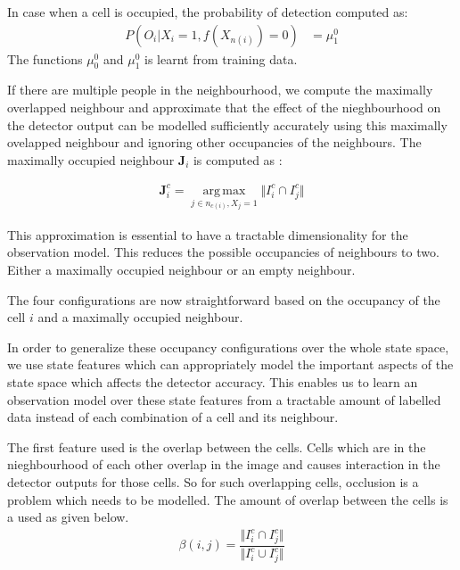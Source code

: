 \documentclass[10pt,twocolumn,letterpaper]{article}
\begin{document}
In case when a cell is occupied, the probability of detection computed as:
\begin{align}
 P(O_{i} |X_{i}=1 ,f(X_{n(i)}) =0)  &=\mu^{0}_{1}
\end{align}
The functions $ \mu^{0}_{0} $  and $ \mu^{0}_{1} $ is learnt from training data.


If there are multiple people in the neighbourhood, we compute the maximally overlapped neighbour and approximate that the effect of the nieghbourhood on the detector output can be modelled sufficiently accurately using this maximally ovelapped neighbour and ignoring other occupancies of the neighbours. The maximally occupied neighbour $ \textbf{J}_{i} $ is computed as :

\begin{align}
 \textbf{J}_{i}^{c} = \operatorname*{arg\,max}_{j\in n_{c(i)},X_{j}=1} \Vert I_{i}^{c}\cap I_{j}^{c} \Vert  
\end{align}

This approximation is essential to have a tractable dimensionality for the observation model. 
This reduces the possible occupancies of neighbours to two. Either a maximally occupied neighbour or an empty neighbour. 

The four configurations are now straightforward based on the occupancy of the cell $i$ and a maximally occupied neighbour.

In order to generalize these occupancy configurations over the whole state space, we use state features which can appropriately  
model the important aspects of the state space which affects the detector accuracy. This enables us to learn an observation model over these state features from a tractable amount of labelled data instead of each combination of a cell and its neighbour.

The first feature used is the overlap between the cells. Cells which are in the nieghbourhood of each other overlap in the image and causes interaction in the detector outputs for those cells. So for such overlapping cells, occlusion is a problem which needs to be modelled. The amount of overlap between the cells is a used as given below. 
\begin{align}
\beta(i,j) = \dfrac{\Vert I_{i}^{c} \cap I_{j}^{c} \Vert}{\Vert I_{i}^{c} \cup I_{j}^{c} \Vert}
\end{align}
\end{document}
